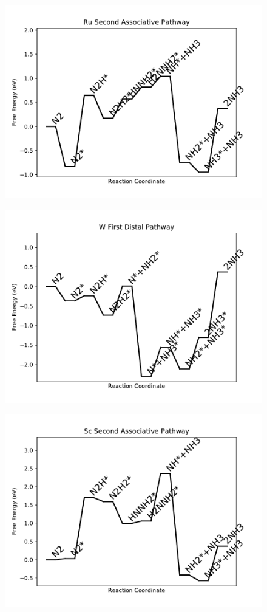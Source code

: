 \begin{figure}
\centering
\includegraphics[width=0.8\linewidth]{data/plots/Ru_associative_2.pdf}
\end{figure}

\begin{figure}
\centering
\includegraphics[width=0.8\linewidth]{data/plots/W_distal_1.pdf}
\end{figure}

\begin{figure}
\centering
\includegraphics[width=0.8\linewidth]{data/plots/Sc_associative_2.pdf}
\end{figure}

